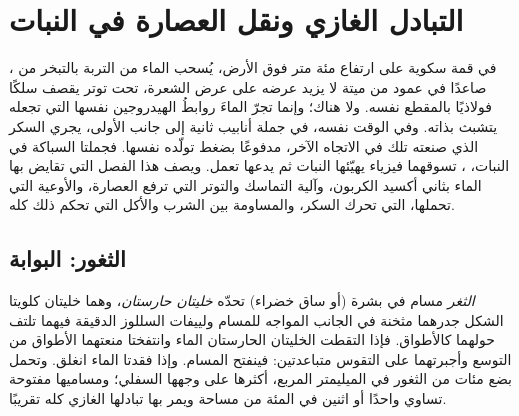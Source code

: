 \chapter{التبادل الغازي ونقل العصارة في النبات}\label{ch:b1:plant-transport}

في قمة سكوية على ارتفاع مئة متر فوق الأرض، يُسحب الماء من التربة
بالتبخر من ، صاعدًا في عمود من  ميتة لا يزيد عرضه على
عرض الشعرة، تحت توتر يقصف سلكًا فولاذيًا بالمقطع نفسه. ولا 
هناك؛ وإنما تجرّ الماءَ روابطُ الهيدروجين نفسها التي تجعله يتشبث
بذاته. وفي الوقت نفسه، في جملة أنابيب ثانية إلى جانب الأولى، يجري
السكر الذي صنعته تلك  في الاتجاه الآخر، مدفوعًا بضغط تولّده
 نفسها. فجملتا السباكة في النبات،  ، تسوقهما
فيزياء يهيّئها النبات ثم يدعها تعمل. ويصف هذا الفصل  التي
تقايض بها  الماء بثاني أكسيد الكربون، وآلية التماسك والتوتر
التي ترفع العصارة، والأوعية التي تحملها،  التي
تحرك السكر، والمساومة بين الشرب والأكل التي تحكم ذلك كله.

\section{الثغور: البوابة}

\begin{definition}\label{def:b1:plant-transport:stoma}
\emph{الثغر} مسام في بشرة  (أو ساق خضراء) تحدّه
\emph{خليتان حارستان}، وهما خليتان كلويتا الشكل جدرهما مثخنة في
الجانب المواجه للمسام ولييفات السللوز الدقيقة فيهما تلتف حولهما
كالأطواق. فإذا التقطت الخليتان الحارستان الماء وانتفختا منعتهما
الأطواق من التوسع وأجبرتهما على التقوس متباعدتين: فينفتح المسام.
وإذا فقدتا الماء انغلق. وتحمل  بضع مئات من الثغور في
الميليمتر المربع، أكثرها على وجهها السفلي؛ ومساميها مفتوحة تساوي
واحدًا أو اثنين في المئة من مساحة  ويمر بها تبادلها الغازي
كله تقريبًا.
\end{definition}

